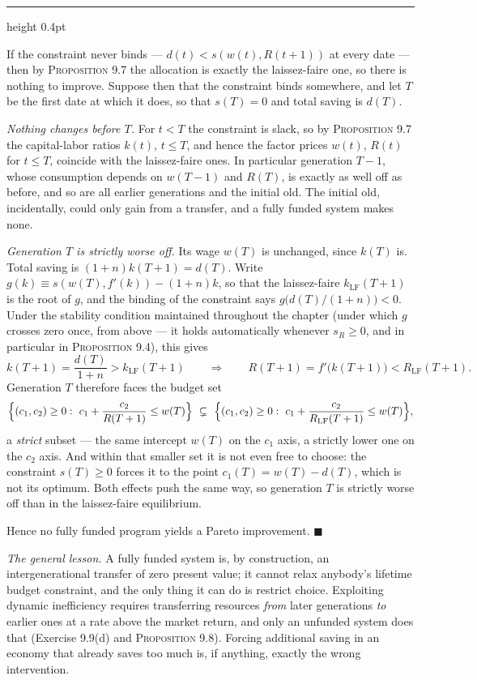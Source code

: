 \documentclass[11pt,letterpaper,reqno]{amsart}
\makeatletter
\newcommand{\as@head}[3]{%
  \par\addvspace{1.6ex}\penalty-200\relax
  \phantomsection
  \addcontentsline{toc}{subsection}{#1 #2\texorpdfstring{\ifx\relax#3\relax\else\quad #3\fi}{}}%
  {\color{RuleGrey}\hrule height 0.4pt}%
  \nobreak\vspace{0.8ex}\nobreak
  \noindent{\bfseries #1 #2}%
  \ifx\relax#3\relax\else\quad{\bfseries\itshape #3}\fi
  \par\nobreak\vspace{0.4ex}\nobreak
  \as@beginstatement
}
\newcommand{\as@beginstatement}{\begingroup\itshape\ignorespaces}
\newenvironment{aex}[2]{\as@head{Exercise}{#1}{#2}}{\par\addvspace{1.2ex}}
\newcommand{\bk}[1]{\textup{\textsc{#1}}}
\renewcommand{\as@beginstatement}{\ignorespaces}
\makeatother
\begin{document}
\begin{aex}{9.14}{}
If the constraint never binds --- $d(t)<s(w(t),R(t+1))$ at every date --- then by
\bk{Proposition 9.7} the allocation is exactly the laissez-faire one, so there is nothing to
improve.  Suppose then that the constraint binds somewhere, and let $T$ be the first date at
which it does, so that $s(T)=0$ and total saving is $d(T)$.

\emph{Nothing changes before $T$.}  For $t<T$ the constraint is slack, so by
\bk{Proposition 9.7} the capital-labor ratios $k(t)$, $t\le T$, and hence the factor prices
$w(t)$, $R(t)$ for $t\le T$, coincide with the laissez-faire ones.  In particular generation
$T-1$, whose consumption depends on $w(T-1)$ and $R(T)$, is exactly as well off as before, and so
are all earlier generations and the initial old.  The initial old, incidentally, could only gain
from a transfer, and a fully funded system makes none.

\emph{Generation $T$ is strictly worse off.}  Its wage $w(T)$ is unchanged, since $k(T)$ is.
Total saving is $(1+n)k(T+1)=d(T)$.  Write $g(k)\equiv s(w(T),f'(k))-(1+n)k$, so that the
laissez-faire $k_{\mathrm{LF}}(T+1)$ is the root of $g$, and the binding of the constraint says
$g\bigl(d(T)/(1+n)\bigr)<0$.  Under the stability condition maintained throughout the chapter
(under which $g$ crosses zero once, from above --- it holds automatically whenever $s_R\ge0$, and
in particular in \bk{Proposition 9.4}), this gives
\[
k(T+1)=\frac{d(T)}{1+n}>k_{\mathrm{LF}}(T+1)
\qquad\Longrightarrow\qquad
R(T+1)=f'\bigl(k(T+1)\bigr)<R_{\mathrm{LF}}(T+1).
\]
Generation $T$ therefore faces the budget set
\[
\Bigl\{(c_1,c_2)\ge0:\ c_1+\frac{c_2}{R(T+1)}\le w(T)\Bigr\}
\ \subsetneq\
\Bigl\{(c_1,c_2)\ge0:\ c_1+\frac{c_2}{R_{\mathrm{LF}}(T+1)}\le w(T)\Bigr\},
\]
a \emph{strict} subset --- the same intercept $w(T)$ on the $c_1$ axis, a strictly lower one on
the $c_2$ axis.  And within that smaller set it is not even free to choose: the constraint
$s(T)\ge0$ forces it to the point $c_1(T)=w(T)-d(T)$, which is not its optimum.  Both effects
push the same way, so generation $T$ is strictly worse off than in the laissez-faire equilibrium.

Hence no fully funded program yields a Pareto improvement. $\blacksquare$

\emph{The general lesson.}  A fully funded system is, by construction, an intergenerational
transfer of zero present value; it cannot relax anybody's lifetime budget constraint, and the
only thing it can do is restrict choice.  Exploiting dynamic inefficiency requires transferring
resources \emph{from} later generations \emph{to} earlier ones at a rate above the market return,
and only an unfunded system does that (Exercise 9.9(d) and \bk{Proposition 9.8}).  Forcing
additional saving in an economy that already saves too much is, if anything, exactly the wrong
intervention.
\end{aex}
\end{document}
